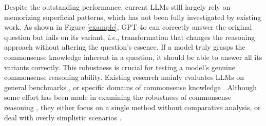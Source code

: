 

Despite the outstanding performance, current LLMs still largely rely on memorizing superficial patterns, which has not been fully investigated by existing work. As shown in Figure \ref{example}, GPT-4o can correctly answer the original question but fails on its variant, \textit{i.e.}, transformation that changes the reasoning approach without altering the question's essence. If a model truly grasps the commonsense knowledge inherent in a question, it should be able to answer all its variants correctly. This robustness is crucial for testing a model's genuine commonsense reasoning ability. 
Existing research mainly evaluates LLMs on general benchmarks \cite{zellers2019hellaswag, talmor2019commonsenseqa, mihaylov2018can}, 
or specific domains of commonsense knowledge \cite{zhou2019going, qin2021timedial, bisk2020piqa}. 
Although some effort has been made in examining the robustness of commonsense reasoning \cite{}, they either focus on a single method without comparative analysis, or deal with overly simplistic scenarios \citep{zhou2021rica}. 

